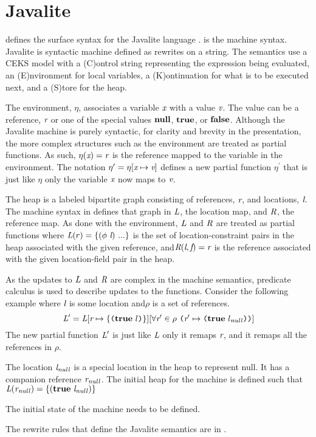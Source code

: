 \section{Javalite}
 defines the surface syntax for the
Javalite language \cite{saints-MS}.  is the
machine syntax. Javalite is syntactic machine defined as rewrites on a
string. The semantics use a CEKS model with a (C)ontrol string
representing the expression being evaluated, an (E)nvironment for
local variables, a (K)ontinuation for what is to be executed next, and
a (S)tore for the heap.




The environment, $\eta$, associates a variable $\emph{x}$ with a
value $\emph{v}$. The value can be a reference, $\emph{r}$ or one of
the special values $\textbf{null}$, $\textbf{true}$, or
$\textbf{false}$. Although the Javalite machine is purely syntactic, for
clarity and brevity in the presentation, the more complex structures
such as the environment are treated as partial functions. As such,
$\eta(\emph{x}) = \emph{r}$ is the reference mapped to the variable
in the environment. The notation $\eta^\prime = \eta[\emph{x} \mapsto
  \emph{v}]$ defines a new partial function $\eta^\prime$ that is
just like $\eta$ only the variable $\emph{x}$ now maps to
$\emph{v}$.

The heap is a labeled bipartite graph consisting of references,
$\emph{r}$, and locations, $\emph{l}$. The machine syntax in
 defines that graph in $\emph{L}$, the
location map, and $\emph{R}$, the reference map. As done with the
environment, $\emph{L}$ and $\emph{R}$ are treated as partial
functions where $\cfgnt{L}(r) = \{(\phi\ \cfgnt{l})\ ...\}$ is the set
of location-constraint pairs in the heap associated with the given
reference, and$\emph{R}(\emph{l},\emph{f}) = \emph{r}$ is the
reference associated with the given location-field pair in the
heap. 

As the updates to $\emph{L}$ and $\emph{R}$ are complex in the
machine semantics, predicate calculus is used to describe updates to
the functions. Consider the following example where $\emph{l}$ is
some location and$\rho$ is a set of references.
\[
\cfgnt{L}^\prime = \cfgnt{L}[\cfgnt{r} \mapsto \{\lp \cfgt{true}\ l\rp \}][\forall \cfgnt{r}^\prime \in \rho\ \lp \cfgnt{r}^\prime \mapsto \lp \cfgt{true}\ l_\mathit{null}\rp \rp ]
\]
The new partial function $\emph{L}^\prime$ is just like $\emph{L}$ only it
remaps $\emph{r}$, and it remaps all the references in $\rho$. 

The location $\emph{l}_\mathit{null}$ is a special location in the heap
to represent null. It has a companion reference
$\emph{r}_\mathit{null}$. The initial heap for the machine is defined
such that $\emph{L}(\emph{r}_\mathit{null}) = \{(\textbf{true}\ \emph{l}_\mathit{null})\}$

The initial state of the machine needs to be defined.



The rewrite rules that define the Javalite semantics are in
.

